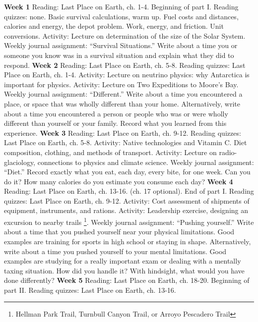 \documentclass[10pt]{article}
\begin{document}
\begin{outline}[enumerate]
\1 \textbf{Week 1}
\2 Reading: Last Place on Earth, ch. 1-4. Beginning of part I.
\2 Reading quizzes: none.
\2 Basic survival calculations, warm up.  Fuel costs and distances, calories and energy, the depot problem.  Work, energy, and friction.  Unit conversions.
\2 Activity: Lecture on determination of the size of the Solar System.
\2 Weekly journal assignment: ``Survival Situations.'' Write about a time you or someone you know was in a survival situation and explain what they did to respond.
\1\textbf{Week 2}
\2 Reading: Last Place on Earth, ch. 5-8.
\2 Reading quizzes: Last Place on Earth, ch. 1-4.
\2 Activity: Lecture on neutrino physics: why Antarctica is important for physics.
\2 Activity: Lecture on Two Expeditions to Moore's Bay.
\2 Weekly journal assignment: ``Different.''  Write about a time you encountered a place, or space that was wholly different than your home.  Alternatively, write about a time you encountered a person or people who was or were wholly different than yourself or your family.  Record what you learned from this experience.
\1 \textbf{Week 3}
\2 Reading: Last Place on Earth, ch. 9-12.
\2 Reading quizzes: Last Place on Earth, ch. 5-8.
\2 Activity: Native technologies and Vitamin C.  Diet composition, clothing, and methods of transport.
\2 Activity: Lecture on radio-glaciology, connections to physics and climate science.
\2 Weekly journal assignment: ``Diet.''  Record exactly what you eat, each day, every bite, for one week.  Can you do it?  How many calories do you estimate you consume each day?
\1 \textbf{Week 4}
\2 Reading: Last Place on Earth, ch. 13-16. (ch. 17 optional). End of part I.
\2 Reading quizzes: Last Place on Earth, ch. 9-12.
\2 Activity: Cost assessment of shipments of equipment, instruments, and rations.
\2 Activity: Leadership exercise, designing an excursion to nearby trails \footnote{Hellman Park Trail, Turnbull Canyon Trail, or Arroyo Pescadero Trail}.
\2 Weekly journal assignment: ``Pushing yourself.''  Write about a time that you pushed yourself near your physical limitations.  Good examples are training for sports in high school or staying in shape.  Alternatively, write about a time you pushed yourself to your mental limitations.  Good examples are studying for a really important exam or dealing with a mentally taxing situation.  How did you handle it?  With hindsight, what would you have done differently?
\1 \textbf{Week 5}
\2 Reading: Last Place on Earth, ch. 18-20. Beginning of part II.
\2 Reading quizzes: Last Place on Earth, ch. 13-16.

\end{outline}
\end{document}
